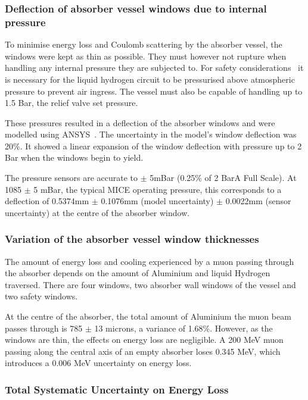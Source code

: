 \subsubsection{Deflection of absorber vessel windows due to internal pressure}
\label{SubSect:Absorber_pressure}

To minimise energy loss and Coulomb scattering by the absorber vessel, the windows were kept as thin as
possible. They must however not rupture when handling any internal pressure they are subjected to. For
safety considerations~\cite{1748-0221-13-09-T09008}\cite{Ishimoto} it is necessary for the liquid hydrogen
circuit to be pressurised above atmospheric pressure to prevent air ingress. The vessel must also be
capable of handling up to 1.5 Bar, the relief valve set pressure.

These pressures resulted in a deflection of the absorber windows and were modelled using
ANSYS~\cite{NOTE155}. The uncertainty in the model's window deflection was 20\%. It showed a linear
expansion of the window deflection with pressure up to 2 Bar when the windows begin to yield. 

The pressure sensors are accurate to $\mathrm{\pm}$ 5mBar (0.25\% of 2 BarA Full Scale). At 1085
$\mathrm{\pm}$ 5 mBar, the typical MICE operating pressure, this corresponds to a deflection of 0.5374mm
$\mathrm{\pm}$ 0.1076mm (model uncertainty) $\mathrm{\pm}$ 0.0022mm (sensor uncertainty) at the centre of
the absorber window.


\subsubsection{Variation of the absorber vessel window thicknesses}
\label{SubSect:Absorber_thickness}

The amount of energy loss and cooling experienced by a muon passing through the absorber depends on the amount of
Aluminium and liquid Hydrogen traversed. There are four windows, two absorber wall windows of the vessel and two safety windows.

At the centre of the absorber, the
total amount of Aluminium the muon beam passes through is 785 $\mathrm{\pm}$ 13 microns, a variance of 1.68\%. However, as the windows are thin, the effects on energy loss are negligible. A 200 MeV muon passing
along the central axis of an empty absorber loses 0.345 MeV, which introduces a 0.006 MeV uncertainty on
energy loss.


\subsubsection{Total Systematic Uncertainty on Energy Loss}
\label{SubSect:Absorber_total}

